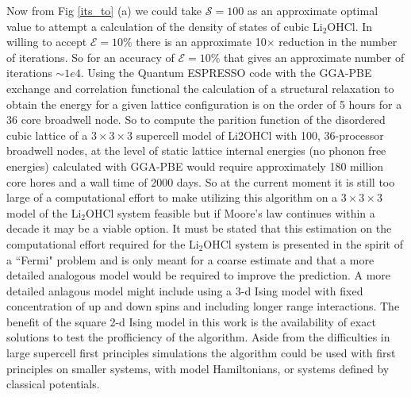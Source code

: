 \documentclass[aps,prl,reprint,superscriptaddress,showkeys]{revtex4-1}
\begin{document}
 Now from Fig \ref{its_to} (a) we could take $\mathcal{S}=100$  as an approximate optimal value to attempt a calculation of the density of states of cubic Li$_2$OHCl. In willing to accept $\mathcal{E}=10\%$ there is an approximate 10$\times$ reduction in the number of iterations. So for an accuracy of $\mathcal{E}=10\%$ that gives an approximate number of iterations  $\sim 1e4$. Using the Quantum ESPRESSO code\cite{PWscf:2009} with the GGA-PBE exchange and correlation functional\cite{PBE} the calculation of a structural relaxation to obtain the energy for a given lattice configuration is on the order of 5 hours for a 36 core broadwell node. So to compute the parition function of the disordered cubic lattice of a $3\times 3 \times 3$ supercell model of Li2OHCl with 100,  36-processor broadwell nodes, at the level of static lattice internal energies (no phonon free energies) calculated with GGA-PBE   would require approximately 180 million core hores and a wall time of 2000 days.   So at the current moment it is still  too large of a computational effort to make utilizing this algorithm on a $3\times  3 \times 3$ model of the Li$_2$OHCl system feasible but if Moore's law continues within a decade it may be a viable option. It must be stated that this estimation on the computational effort required for the Li$_2$OHCl system is presented in the spirit of a ``Fermi" problem and is only meant for a coarse estimate and that a more detailed analogous model would be required to improve the prediction. A more detailed anlagous model might include using a 3-d Ising model with fixed concentration of up and down spins and including longer range interactions. The benefit of the square 2-d Ising model in this work is the availability of exact solutions to test the profficiency of the algorithm. Aside from the difficulties in large supercell first principles simulations the algorithm could be used with first principles on smaller systems, with model Hamiltonians, or systems defined by classical potentials.  
\end{document}
